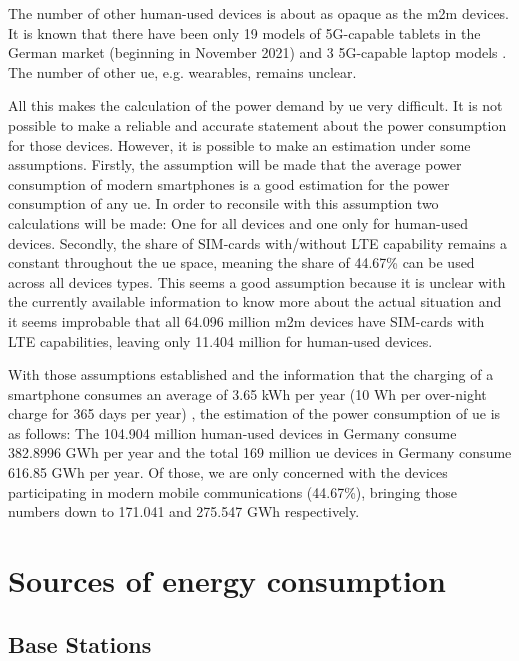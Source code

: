 \documentclass[11pt,a4paper]{article}
\begin{document}
The number of other human-used devices is about as opaque as the \acrshort{m2m} devices.
It is known that there have been only 19 models of 5G-capable tablets in the German market (beginning in November 2021) \citep{tabletmodels} and 3 5G-capable laptop models \citep{laptopmodels}.
The number of other \acrlong{ue}, e.g. wearables, remains unclear.

All this makes the calculation of the power demand by \acrlong{ue} very difficult.
It is not possible to make a reliable and accurate statement about the power consumption for those devices.
However, it is possible to make an estimation under some assumptions.
Firstly, the assumption will be made that the average power consumption of modern smartphones is a good estimation for the power consumption of any \acrshort{ue}.
In order to reconsile with this assumption two calculations will be made: One for all devices and one only for human-used devices.
Secondly, the share of SIM-cards with/without LTE capability remains a constant throughout the \acrlong{ue} space, meaning the share of 44.67\% can be used across all devices types.
This seems a good assumption because it is unclear with the currently available information to know more about the actual situation and it seems improbable that all 64.096 million \acrshort{m2m} devices have SIM-cards with LTE capabilities, leaving only 11.404 million for human-used devices.


With those assumptions established and the information that the charging of a smartphone consumes an average of 3.65 kWh per year (10 Wh per over-night charge for 365 days per year) \citep{smartphonecharge}, the estimation of the power consumption of \acrshort{ue} is as follows:
The 104.904 million human-used devices in Germany consume 382.8996 GWh per year and the total 169 million \acrshort{ue} devices in Germany consume 616.85 GWh per year.
Of those, we are only concerned with the devices participating in modern mobile communications (44.67\%), bringing those numbers down to 171.041 and 275.547 GWh respectively.

\section{Sources of energy consumption}\label{sec:energyconsumption}
\subsection{Base Stations}\label{subsec:BSConsumption}
\end{document}
